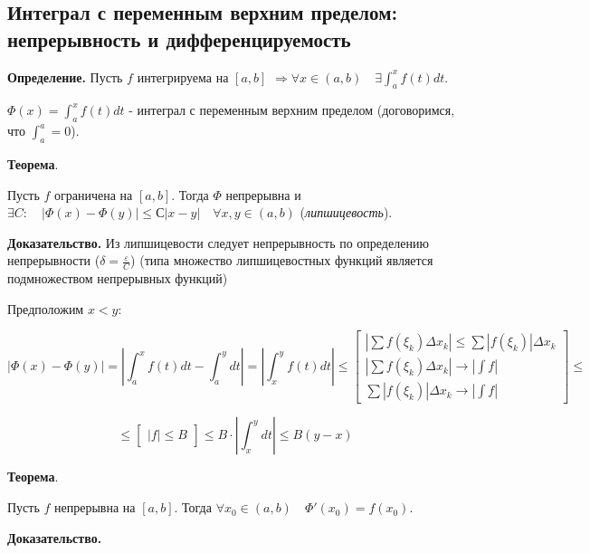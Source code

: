 \documentclass[a4paper]{article}
\begin{document}
\begin{definit}
\hypertarget{p12}{}
\subsection*{Интеграл с переменным верхним пределом: непрерывность и дифференцируемость}

\textbf{Определение.} Пусть $f$ интегрируема на $[a,b]$ $\Rightarrow \forall x \in (a,b) \quad \exists \int_a^x f(t)dt$.

$\Phi(x) = \int_a^x f(t)dt$ - интеграл с переменным верхним пределом (договоримся, что $\int_a^a = 0$).

\begin{htheorem}\textbf{Теорема}.

Пусть $f$ ограничена на $[a,b]$. Тогда $\Phi$ непрерывна и $\exists C: \quad |\Phi(x) - \Phi(y)| \leq С|x-y| \quad \forall x, y \in (a,b)$ (\textit{липшицевость}).
\end{htheorem}

\begin{hproof}\textbf{Доказательство.}
Из липшицевости следует непрерывность по определению непрерывности ($\delta = \frac{\varepsilon}{C}$) (типа множество липшицевостных функций является подмножеством непрерывных функций)


Предположим $x<y$:

\[
	|\Phi(x) - \Phi(y)| = \left| \int_a^x f(t)dt - \int_a^y dt \right| = \left| \int_x^y f(t)dt \right| \leq \begin{bmatrix}
	\left| \sum f(\xi_k) \Delta x_k \right| \leq \sum \left| f(\xi_k) \right| \Delta x_k \\
	\left| \sum f(\xi_k) \Delta x_k \right| \rightarrow |\int f| \\
	 \sum \left| f(\xi_k) \right| \Delta x_k \rightarrow |\int f|
	\end{bmatrix} \leq
\]
 
\[ \leq
 \begin{bmatrix}
 |f| \leq B
 \end{bmatrix} \leq B \cdot \left| \int_x^y dt \right| \leq B(y-x)
\]
\end{hproof}

\begin{htheorem}\textbf{Теорема}.

Пусть $f$ непрерывна на $[a,b]$. Тогда $\forall x_0 \in (a,b) \quad \Phi'(x_0) = f(x_0)$.
\end{htheorem}

\begin{hproof}\textbf{Доказательство.}


\end{hproof}
\end{definit}
\end{document}
